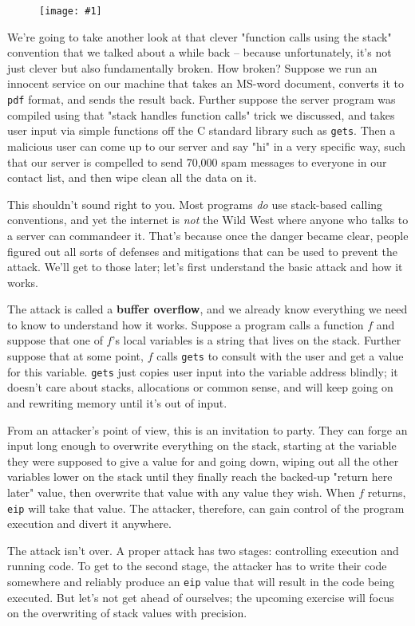 \documentclass{article}
\newcommand{\wrapimageright}[1] {
    \begin{figure}
        \begin{center}
            \texttt{[image: \#1]} 
        \end{center}
    \end{figure}
}
\newcommand{\xcode}[2]{\colorbox{ubuntuback}{\lstinline[language=#1]|#2|}}
\newcommand{\asm}[1]{\xcode{{[x86masm]assembler}}{#1}}
\newcommand{\code}[1]{\colorbox{ubuntuback}{\texttt{#1}}}
\begin{document}
\wrapimageright{./images/buffer_overflow.png}
We're going to take another look at that clever "function calls using the stack" convention that we talked about a while back -- because unfortunately, it's not just clever but also fundamentally broken. How broken? Suppose we run an innocent service on our machine that takes an MS-word document, converts it to \code{pdf} format, and sends the result back. Further suppose the server program was compiled using that "stack handles function calls" trick we discussed, and takes user input via simple functions off the C standard library such as \xcode{C}{gets}. Then a malicious user can come up to our server and say "hi" in a very specific way, such that our server is compelled to send 70,000 spam messages to everyone in our contact list, and then wipe clean all the data on it.

This shouldn't sound right to you. Most programs \textit{do} use stack-based calling conventions, and yet the internet is \textit{not} the Wild West where anyone who talks to a server can commandeer it. That's because once the danger became clear, people figured out all sorts of defenses and mitigations that can be used to prevent the attack. We'll get to those later; let's first understand the basic attack and how it works.

The attack is called a \textbf{buffer overflow}, and we already know everything we need to know to understand how it works. Suppose a program calls a function $f$ and suppose that one of $f$'s local variables is a string that lives on the stack. Further suppose that at some point, $f$ calls \xcode{C}{gets} to consult with the user and get a value for this variable. \xcode{C}{gets} just copies user input into the variable address blindly; it doesn't care about stacks, allocations or common sense, and will keep going on and rewriting memory until it's out of input.

From an attacker's point of view, this is an invitation to party. They can forge an input long enough to overwrite everything on the stack, starting at the variable they were supposed to give a value for and going down, wiping out all the other variables lower on the stack until they finally reach the backed-up "return here later" value, then overwrite that value with any value they wish. When $f$ returns, \asm{eip} will take that value. The attacker, therefore, can gain control of the program execution and divert it anywhere.

The attack isn't over. A proper attack has two stages: controlling execution and running code. To get to the second stage, the attacker has to write their code somewhere and reliably produce an \asm{eip} value that will result in the code being executed. But let's not get ahead of ourselves; the upcoming exercise will focus on the overwriting of stack values with precision.
\end{document}

